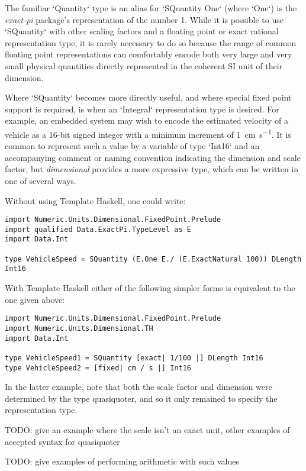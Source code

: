 \documentclass[11pt]{report}
\newcommand{\packagename}[1]{\textit{#1}}
\newcommand{\thispackage}{\packagename{dimensional}}
\begin{document}
The familiar `Quantity` type is an alias for `SQuantity One` (where `One`) is the \packagename{exact-pi}
package's representation of the number 1. While it is possible to use `SQuantity` with other scaling factors and a
floating point or exact rational representation type, it is rarely necessary to do so because the range of common floating
point representations can comfortably encode both very large and very small physical quantities directly represented in the
coherent SI unit of their dimension.

Where `SQuantity` becomes more directly useful, and where special fixed point support is required, is when an
`Integral` representation type is desired. For example, an embedded system may wish to encode the estimated
velocity of a vehicle as a 16-bit signed integer with a minimum increment of \SI{1}{\centi\meter\per\second}. It is common
to represent such a value by a variable of type `Int16` and an accompanying comment or naming convention indicating
the dimension and scale factor, but \thispackage{} provides a more expressive type, which can be written in one of several ways.

Without using Template Haskell, one could write:

\begin{lstlisting}
import Numeric.Units.Dimensional.FixedPoint.Prelude
import qualified Data.ExactPi.TypeLevel as E
import Data.Int

type VehicleSpeed = SQuantity (E.One E./ (E.ExactNatural 100)) DLength Int16
\end{lstlisting}

With Template Haskell either of the following simpler forms is equivalent to the one given above:

\begin{lstlisting}
import Numeric.Units.Dimensional.FixedPoint.Prelude
import Numeric.Units.Dimensional.TH
import Data.Int

type VehicleSpeed1 = SQuantity [exact| 1/100 |] DLength Int16
type VehicleSpeed2 = [fixed| cm / s |] Int16
\end{lstlisting}

In the latter example, note that both the scale factor and dimension were determined by the type quasiquoter, and so it
only remained to specify the representation type.

TODO: give an example where the scale isn't an exact unit, other examples of accepted syntax for quasiquoter

TODO: give examples of performing arithmetic with such values
\end{document}
